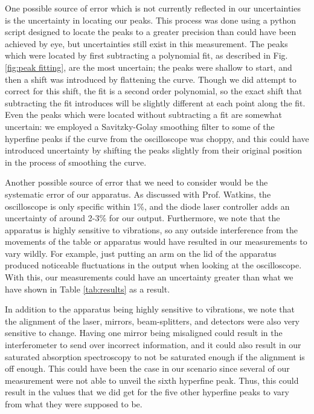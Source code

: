 \documentclass[twocolumn,amsmath,amssymb,pra, floatfix]{revtex4-2}
\begin{document}
One possible source of error which is not currently reflected in our uncertainties is the uncertainty in locating our peaks. This process was done using a python script designed to locate the peaks to a greater precision than could have been achieved by eye, but uncertainties still exist in this measurement. The peaks which were located by first subtracting a polynomial fit, as described in Fig. \ref{fig:peak fitting}, are the most uncertain; the peaks were shallow to start, and then a shift was introduced by flattening the curve. Though we did attempt to correct for this shift, the fit is a second order polynomial, so the exact shift that subtracting the fit introduces will be slightly different at each point along the fit. Even the peaks which were located without subtracting a fit are somewhat uncertain: we employed a Savitzky-Golay smoothing filter to some of the hyperfine peaks if the curve from the oscilloscope was choppy, and this could have introduced uncertainty by shifting the peaks slightly from their original position in the process of smoothing the curve. 

Another possible source of error that we need to consider would be the systematic error of our apparatus. As discussed with Prof. Watkins, the oscilloscope is only specific within 1\%, and the diode laser controller adds an uncertainty of around 2-3\% for our output. Furthermore, we note that the apparatus is highly sensitive to vibrations, so any outside interference from the movements of the table or apparatus would have resulted in our measurements to vary wildly. For example, just putting an arm on the lid of the apparatus produced noticeable fluctuations in the output when looking at the oscilloscope. With this, our measurements could have an uncertainty greater than what we have shown in Table \ref{tab:results} as a result. 

In addition to the apparatus being highly sensitive to vibrations, we note that the alignment of the laser, mirrors, beam-splitters, and detectors were also very sensitive to change. Having one mirror being misaligned could result in the interferometer to send over incorrect information, and it could also result in our saturated absorption spectroscopy to not be saturated enough if the alignment is off enough. This could have been the case in our scenario since several of our measurement were not able to unveil the sixth hyperfine peak. Thus, this could result in the values that we did get for the five other hyperfine peaks to vary from what they were supposed to be. 
\end{document}
